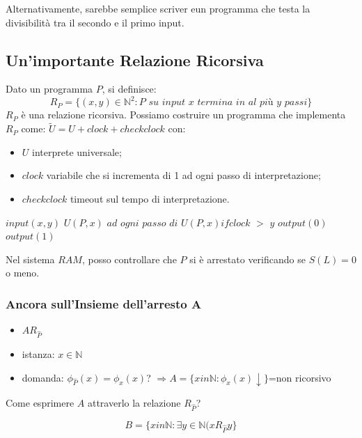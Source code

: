 \documentclass{article}
\begin{document}
Alternativamente, sarebbe semplice scriver eun programma che testa la divisibilità tra il secondo e il primo input.
\subsection{Un'importante Relazione Ricorsiva}
Dato un programma $P$, si definisce:
\begin{displaymath}
	R_P=\{ (x,y) \in \mathbb{N}^2: P\textit{ su input $x$ termina in al più $y$ passi} \}
\end{displaymath}
$R_P$ è una relazione ricorsiva. Possiamo costruire un programma che implementa $R_P$ come: $\tilde{U}=U+clock+checkclock$ con:
\begin{itemize}
	\item $U$ interprete universale;
	\item $clock$ variabile che si incrementa di 1 ad ogni passo di interpretazione;
	\item $checkclock$ timeout sul tempo di interpretazione.
\end{itemize}

\begin{algorithm}[h]
	\caption{$\tilde{U}\equiv$}
        \begin{algorithmic}[1]
        		 \State $input(x,y)$
        		 \State $U(P,x)$
        		 \State $ \textit{ad ogni passo di $U(P,x)$} if clock$ $>$ $y$ $output(0)$ 
        		 \State $output(1)$
        		  
        \end{algorithmic}
    \end{algorithm}
Nel sistema $RAM$, posso controllare che $P$ si è arrestato verificando se $S(L)=0$ o meno.

\subsubsection{Ancora sull'Insieme dell'arresto A}
\begin{itemize}
	\item $AR_{\hat{P}}$
	\item istanza: $x \in \mathbb{N}$
	\item domanda: $\phi_{\hat{P}}(x)=\phi_x(x)$? $\Rightarrow A= \{ x in \mathbb{N}:\phi_x(x)\downarrow \}$=non ricorsivo
\end{itemize}
Come esprimere $A$ attraverlo la relazione $R_{\hat{P}}$?

\begin{displaymath}
	B= \{ x in \mathbb{N}: \exists y \in \mathbb{N} (x R_{\hat{P}} y \}
\end{displaymath}
\end{document}
